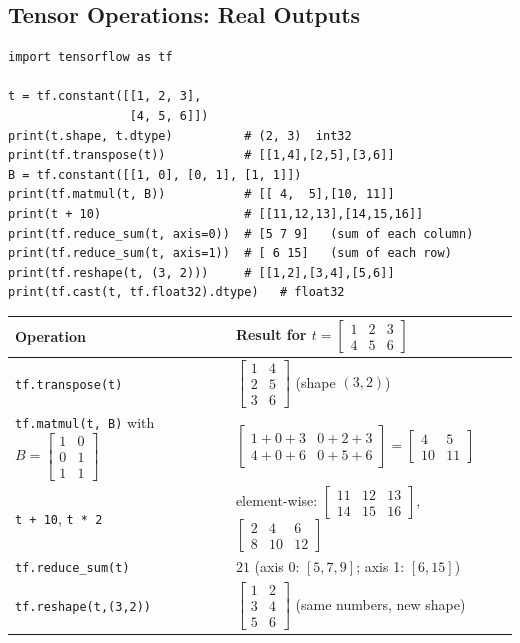 \subsection{Tensor Operations: Real Outputs}

\begin{lstlisting}
import tensorflow as tf

t = tf.constant([[1, 2, 3],
                 [4, 5, 6]])
print(t.shape, t.dtype)          # (2, 3)  int32
print(tf.transpose(t))           # [[1,4],[2,5],[3,6]]
B = tf.constant([[1, 0], [0, 1], [1, 1]])
print(tf.matmul(t, B))           # [[ 4,  5],[10, 11]]
print(t + 10)                    # [[11,12,13],[14,15,16]]
print(tf.reduce_sum(t, axis=0))  # [5 7 9]   (sum of each column)
print(tf.reduce_sum(t, axis=1))  # [ 6 15]   (sum of each row)
print(tf.reshape(t, (3, 2)))     # [[1,2],[3,4],[5,6]]
print(tf.cast(t, tf.float32).dtype)   # float32
\end{lstlisting}

\begin{center}
\begin{tabular}{@{}p{4.2cm}p{9.2cm}@{}}
\toprule
\textbf{Operation} & \textbf{Result for} $t=\begin{bmatrix}1&2&3\\4&5&6\end{bmatrix}$\\
\midrule
\texttt{tf.transpose(t)} & $\begin{bmatrix}1&4\\2&5\\3&6\end{bmatrix}$ (shape $(3,2)$)\\[3mm]
\texttt{tf.matmul(t, B)} with $B=\begin{bmatrix}1&0\\0&1\\1&1\end{bmatrix}$ & $\begin{bmatrix}1+0+3&0+2+3\\4+0+6&0+5+6\end{bmatrix}=\begin{bmatrix}4&5\\10&11\end{bmatrix}$\\[3mm]
\texttt{t + 10}, \texttt{t * 2} & element-wise: $\begin{bmatrix}11&12&13\\14&15&16\end{bmatrix}$, $\begin{bmatrix}2&4&6\\8&10&12\end{bmatrix}$\\[3mm]
\texttt{tf.reduce\_sum(t)} & $21$ \quad (axis 0: $[5,7,9]$; axis 1: $[6,15]$)\\
\texttt{tf.reshape(t,(3,2))} & $\begin{bmatrix}1&2\\3&4\\5&6\end{bmatrix}$ (same numbers, new shape)\\
\bottomrule
\end{tabular}
\end{center}

